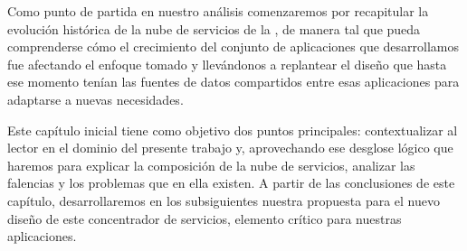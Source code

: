 Como punto de partida en nuestro análisis comenzaremos por recapitular la evolución histórica de la nube de servicios de la \unlp, de manera tal que pueda comprenderse cómo el crecimiento del conjunto de aplicaciones que desarrollamos fue afectando el enfoque tomado y llevándonos a replantear el diseño que hasta ese momento tenían las fuentes de datos compartidos entre esas aplicaciones para adaptarse a nuevas necesidades.

Este capítulo inicial tiene como objetivo dos puntos principales: contextualizar al lector en el dominio del presente trabajo y, aprovechando ese desglose lógico que haremos para explicar la composición de la nube de servicios, analizar las falencias y los problemas que en ella existen. A partir de las conclusiones de este capítulo, desarrollaremos en los subsiguientes nuestra propuesta para el nuevo diseño de este concentrador de servicios, elemento crítico para nuestras aplicaciones.
